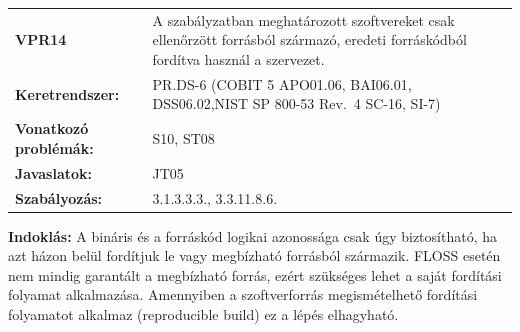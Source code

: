 \documentclass[12pt,magyar,a4paper,oneside]{scrreprt}
\begin{document}
\begin{longtable}[]{@{}ll@{}}
\toprule
\endhead
\begin{minipage}[t]{0.16\columnwidth}\raggedright
\textbf{VPR14}\strut
\end{minipage} & \begin{minipage}[t]{0.79\columnwidth}\raggedright
A szabályzatban meghatározott szoftvereket csak ellenőrzött forrásból
származó, eredeti forráskódból fordítva használ a szervezet.\strut
\end{minipage}\tabularnewline
\begin{minipage}[t]{0.16\columnwidth}\raggedright
\textbf{Keretrendszer:}\strut
\end{minipage} & \begin{minipage}[t]{0.79\columnwidth}\raggedright
PR.DS-6 (COBIT 5 APO01.06, BAI06.01, DSS06.02,NIST SP 800-53 Rev.~4
SC-16, SI-7)\strut
\end{minipage}\tabularnewline
\begin{minipage}[t]{0.16\columnwidth}\raggedright
\textbf{Vonatkozó problémák:}\strut
\end{minipage} & \begin{minipage}[t]{0.79\columnwidth}\raggedright
S10, ST08\strut
\end{minipage}\tabularnewline
\begin{minipage}[t]{0.16\columnwidth}\raggedright
\textbf{Javaslatok:}\strut
\end{minipage} & \begin{minipage}[t]{0.79\columnwidth}\raggedright
JT05\strut
\end{minipage}\tabularnewline
\begin{minipage}[t]{0.16\columnwidth}\raggedright
\textbf{Szabályozás:}\strut
\end{minipage} & \begin{minipage}[t]{0.79\columnwidth}\raggedright
3.1.3.3.3., 3.3.11.8.6.\strut
\end{minipage}\tabularnewline
\bottomrule
\end{longtable}

\textbf{Indoklás: } A bináris és a forráskód logikai azonossága csak úgy
biztosítható, ha azt házon belül fordítjuk le vagy megbízható forrásból
származik. FLOSS esetén nem mindig garantált a megbízható forrás, ezért
szükséges lehet a saját fordítási folyamat alkalmazása. Amennyiben a
szoftverforrás megismételhető fordítási folyamatot alkalmaz
(reproducible build) ez a lépés elhagyható.
\end{document}
